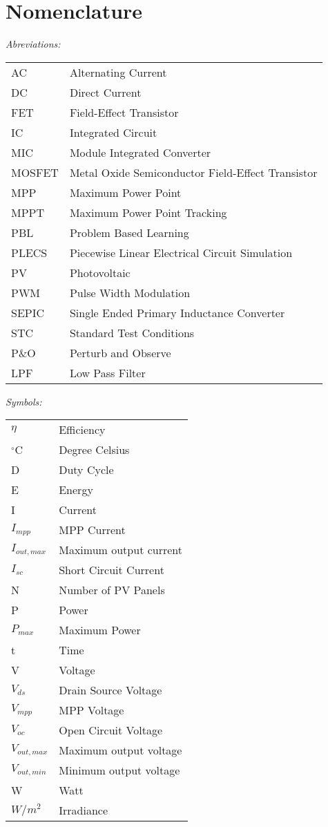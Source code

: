 \chapter*{Nomenclature}

\vspace{-10mm} %
\textit{Abreviations:}\newline
\begin{tabular}{ll} %
AC & Alternating Current\\
DC & Direct Current\\
FET & Field-Effect Transistor\\
IC & Integrated Circuit\\
MIC & Module Integrated Converter\\
MOSFET & Metal Oxide Semiconductor Field-Effect Transistor\\
MPP & Maximum Power Point\\
MPPT & Maximum Power Point Tracking\\
PBL & Problem Based Learning\\
PLECS & Piecewise Linear Electrical Circuit Simulation\\
PV & Photovoltaic\\
PWM & Pulse Width Modulation\\
SEPIC & Single Ended Primary Inductance Converter\\
STC & Standard Test Conditions\\
P\&O & Perturb and Observe\\
LPF & Low Pass Filter
\end{tabular}

\vspace{5mm} %

\noindent\textit{Symbols:}\newline
\begin{tabular}{ll}
$\eta$ & Efficiency\\
$^\circ$C & Degree Celsius\\
D & Duty Cycle\\
E & Energy\\
I & Current\\
$I_{mpp}$ & MPP Current\\
$I_{out,max}$ & Maximum output current \\
$I_{sc}$ & Short Circuit Current\\
N & Number of PV Panels \\
P & Power\\
$P_{max}$ & Maximum Power\\
t & Time\\
V & Voltage\\
$V_{ds}$ & Drain Source Voltage\\
$V_{mpp}$ & MPP Voltage\\
$V_{oc}$ & Open Circuit Voltage\\
$V_{out,max}$ & Maximum output voltage \\
$V_{out,min}$ & Minimum output voltage \\
W & Watt\\
$W/m^2$ & Irradiance\\
\end{tabular}